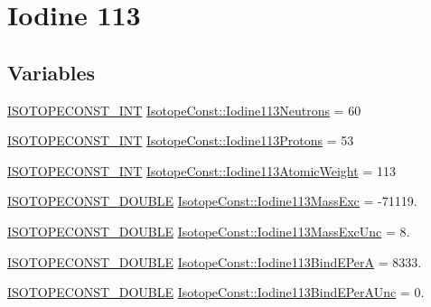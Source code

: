\hypertarget{group___isotope_const-_iodine-_i113}{}\section{Iodine 113}
\label{group___isotope_const-_iodine-_i113}
\subsection*{Variables}
\begin{DoxyCompactItemize}
\item 
\mbox{\hyperlink{group___isotope_const-_macros_ga5f18360b3e99483a35c32d789e62621c}{I\+S\+O\+T\+O\+P\+E\+C\+O\+N\+S\+T\+\_\+\+I\+NT}} \mbox{\hyperlink{group___isotope_const-_iodine-_i113_gafbabf92087f1fa5742be83c857ed204f}{Isotope\+Const\+::\+Iodine113\+Neutrons}} = 60
\item 
\mbox{\hyperlink{group___isotope_const-_macros_ga5f18360b3e99483a35c32d789e62621c}{I\+S\+O\+T\+O\+P\+E\+C\+O\+N\+S\+T\+\_\+\+I\+NT}} \mbox{\hyperlink{group___isotope_const-_iodine-_i113_ga080ba384589a9963c89fa3728aee13bb}{Isotope\+Const\+::\+Iodine113\+Protons}} = 53
\item 
\mbox{\hyperlink{group___isotope_const-_macros_ga5f18360b3e99483a35c32d789e62621c}{I\+S\+O\+T\+O\+P\+E\+C\+O\+N\+S\+T\+\_\+\+I\+NT}} \mbox{\hyperlink{group___isotope_const-_iodine-_i113_gad462b21d7412ed013167e66f4bc82f57}{Isotope\+Const\+::\+Iodine113\+Atomic\+Weight}} = 113
\item 
\mbox{\hyperlink{group___isotope_const-_macros_ga8f45a7272ce02c0b4c65c44636ed719a}{I\+S\+O\+T\+O\+P\+E\+C\+O\+N\+S\+T\+\_\+\+D\+O\+U\+B\+LE}} \mbox{\hyperlink{group___isotope_const-_iodine-_i113_ga4b85299b3263309ae9ae7682f3e3ac81}{Isotope\+Const\+::\+Iodine113\+Mass\+Exc}} = -\/71119.
\item 
\mbox{\hyperlink{group___isotope_const-_macros_ga8f45a7272ce02c0b4c65c44636ed719a}{I\+S\+O\+T\+O\+P\+E\+C\+O\+N\+S\+T\+\_\+\+D\+O\+U\+B\+LE}} \mbox{\hyperlink{group___isotope_const-_iodine-_i113_gad337bab7e93a2af64ae084bfef52e61c}{Isotope\+Const\+::\+Iodine113\+Mass\+Exc\+Unc}} = 8.
\item 
\mbox{\hyperlink{group___isotope_const-_macros_ga8f45a7272ce02c0b4c65c44636ed719a}{I\+S\+O\+T\+O\+P\+E\+C\+O\+N\+S\+T\+\_\+\+D\+O\+U\+B\+LE}} \mbox{\hyperlink{group___isotope_const-_iodine-_i113_ga0278795d058584bc5e20fa7afebc7c66}{Isotope\+Const\+::\+Iodine113\+Bind\+E\+PerA}} = 8333.
\item 
\mbox{\hyperlink{group___isotope_const-_macros_ga8f45a7272ce02c0b4c65c44636ed719a}{I\+S\+O\+T\+O\+P\+E\+C\+O\+N\+S\+T\+\_\+\+D\+O\+U\+B\+LE}} \mbox{\hyperlink{group___isotope_const-_iodine-_i113_gaed5385e0c14878464673895b029e1639}{Isotope\+Const\+::\+Iodine113\+Bind\+E\+Per\+A\+Unc}} = 0.

\end{DoxyCompactItemize}
